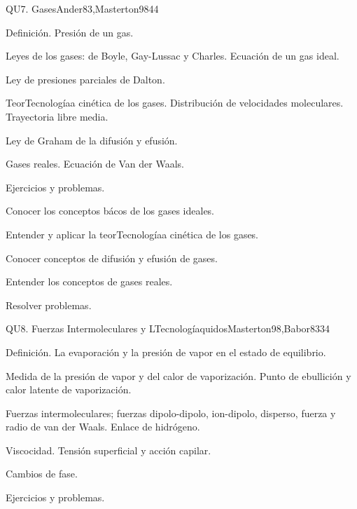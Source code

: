 \begin{syllabus}
\begin{unit}{}{QU7. Gases}{Ander83,Masterton98}{4}{4}
\begin{topics}
      \item Definición. Presión de un gas.
      \item Leyes de los gases: de Boyle, Gay-Lussac y Charles. Ecuación de un gas ideal.
      \item Ley de presiones parciales de Dalton.
      \item TeorTecnologíaa cinética de los gases. Distribución de velocidades moleculares. Trayectoria libre media.
      \item Ley de Graham de la difusión y efusión.
      \item Gases reales. Ecuación de Van der Waals.
      \item Ejercicios y problemas.
   \end{topics}

   \begin{learningoutcomes}
      \item Conocer los conceptos bácos de los gases ideales.
      \item Entender y aplicar la teorTecnologíaa cinética de los gases.
      \item Conocer conceptos de difusión y efusión de gases.
      \item Entender los conceptos de gases reales.
      \item Resolver problemas.
   \end{learningoutcomes}
\end{unit}

\begin{unit}{}{QU8. Fuerzas Intermoleculares y LTecnologíaquidos}{Masterton98,Babor83}{3}{4}
\begin{topics}
      \item Definición. La evaporación y la presión de vapor en el estado de equilibrio.
      \item Medida de la presión de vapor y del calor de vaporización. Punto de ebullición y calor latente de vaporización.
      \item Fuerzas intermoleculares; fuerzas dipolo-dipolo, ion-dipolo, disperso, fuerza y radio de van der Waals. Enlace de hidrógeno.
      \item Viscocidad. Tensión superficial y acción capilar.
      \item Cambios de fase.
      \item Ejercicios y problemas.
    \end{topics}


\end{unit}
\end{syllabus}
